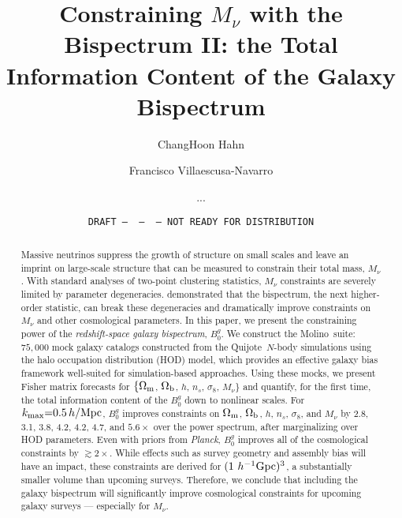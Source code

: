 \documentclass[12pt, letterpaper, preprint]{aastex63}
\newcommand{\Om}{\Omega_{\rm m}}
\newcommand{\Ob}{\Omega_{\rm b}}
\newcommand{\smnu}{M_\nu}
\newcommand{\sig}{\sigma_8}
\newcommand{\hmpc}{\,h/\mathrm{Mpc}}
\newcommand{\quij}{{\sc Quijote}}
\newcommand{\molino}{{\sc Molino}}
\newcommand{\planck}{{\em Planck}}
\newcommand{\kmax}{k_{\rm max}}
\newcommand{\Bg}{B^g_0}
\begin{document}

\title{Constraining $\smnu$ with the Bispectrum II: the Total Information Content of the Galaxy Bispectrum} 
\date{\texttt{DRAFT~---~\githash~---~\gitdate~---~NOT READY FOR DISTRIBUTION}}

\author{ChangHoon Hahn}

\author{Francisco Villaescusa-Navarro} 

\author{...}

\begin{abstract}
    Massive neutrinos suppress the growth of structure on small scales %
    and leave an imprint on large-scale structure that can be measured to
    constrain their total mass, $\smnu$. With standard analyses of two-point
    clustering statistics, $\smnu$ constraints are severely limited by parameter
    degeneracies. \cite{hahn2020} demonstrated that the bispectrum, the
    next higher-order statistic, can break these degeneracies and dramatically
    improve constraints on $\smnu$ and other cosmological parameters. In this
    paper, we present the constraining power of the {\em redshift-space galaxy 
    bispectrum}, $\Bg$. We construct the \molino~suite: $75,000$ mock galaxy
    catalogs constructed from the \quij~$N$-body simulations using the halo occupation distribution (HOD) model,
    which provides an effective galaxy bias framework well-suited for simulation-based
    approaches. Using these mocks, we present Fisher matrix forecasts for 
    $\{\Om$, $\Ob$, $h$, $n_s$, $\sig$, $\smnu\}$ and
    quantify, for the first time, the total information content of the $\Bg$
    down to nonlinear scales. For $\kmax{=}0.5\hmpc$, $\Bg$ improves constraints 
    on $\Om$, $\Ob$, $h$, $n_s$, $\sig$, and $\smnu$ by 2.8, 3.1, 3.8, 4.2,
    4.2, 4.7, and $5.6{\times}$ over the power spectrum, after marginalizing
    over HOD parameters. Even with priors from
    \planck, $\Bg$ improves all of the cosmological constraints by $\gtrsim 2\times$. 
    While effects such as survey geometry and assembly bias will have an
    impact, these %
    constraints are derived for $(1~h^{-1}{\rm Gpc})^3$, a substantially
    smaller volume than upcoming surveys. Therefore, we conclude that including
    the galaxy bispectrum will significantly improve cosmological constraints
    for upcoming galaxy surveys --- especially for $\smnu$. \vspace{1cm}
\end{abstract}
\end{document}
